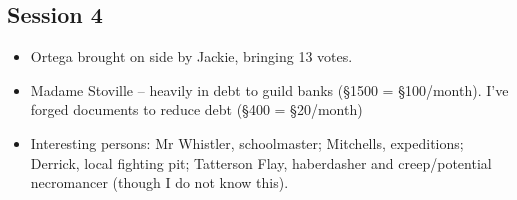 \documentclass[10pt,a4paper]{article}
\begin{document}
\begin{minipage}[t]{\textwidth}
\subsection*{Session 4}
  
  \begin{itemize}
    \item Ortega brought on side by Jackie, bringing 13 votes.
    \item Madame Stoville -- heavily in debt to guild banks (§1500 = §100/month). I've forged documents to reduce debt (§400 = §20/month)
    \item Interesting persons: Mr Whistler, schoolmaster; Mitchells, expeditions; Derrick, local fighting pit; Tatterson Flay, haberdasher and creep/potential necromancer (though I do not know this).
  \end{itemize}

\end{minipage}

\newpage
\end{document}
